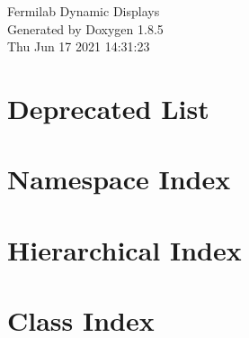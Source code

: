 \documentclass[twoside]{book}
\newcommand{\clearemptydoublepage}{%
  \newpage{\pagestyle{empty}\cleardoublepage}%
}
\begin{document}
\hypersetup{pageanchor=false}
\begin{titlepage}
\vspace*{7cm}
\begin{center}%
{\Large Fermilab Dynamic Displays }\\
\vspace*{1cm}
{\large Generated by Doxygen 1.8.5}\\
\vspace*{0.5cm}
{\small Thu Jun 17 2021 14:31:23}\\
\end{center}
\end{titlepage}
\clearemptydoublepage
\tableofcontents
\clearemptydoublepage
{}
\hypersetup{pageanchor=true}

\chapter{Deprecated List}
\label{deprecated}
\hypertarget{deprecated}{}

\chapter{Namespace Index}

\chapter{Hierarchical Index}

\chapter{Class Index}

\end{document}
